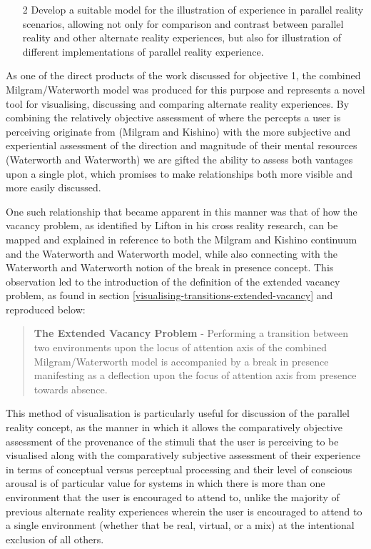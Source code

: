 \begin{enumerate}
	\item[2] Develop a suitable model for the illustration of experience in parallel reality scenarios, allowing not only for comparison and contrast between parallel reality and other alternate reality experiences, but also for illustration of different implementations of parallel reality experience.
\end{enumerate}

As one of the direct products of the work discussed for objective 1, the combined Milgram/Waterworth model was produced for this purpose and represents a novel tool for visualising, discussing and comparing alternate reality experiences. By combining the relatively objective assessment of where the percepts a user is perceiving originate from (Milgram and Kishino) with the more subjective and experiential assessment of the direction and magnitude of their mental resources (Waterworth and Waterworth) we are gifted the ability to assess both vantages upon a single plot, which promises to make relationships both more visible and more easily discussed.

One such relationship that became apparent in this manner was that of how the vacancy problem, as identified by Lifton in his cross reality research, can be mapped and explained in reference to both the Milgram and Kishino continuum and the Waterworth and Waterworth model, while also connecting with the Waterworth and Waterworth notion of the break in presence concept. This observation led to the introduction of the definition of the extended vacancy problem, as found in section \ref{visualising-transitions-extended-vacancy} and reproduced below:

\begin{quote}
	\textbf{The Extended Vacancy Problem} - Performing a transition between two environments upon the locus of attention axis of the combined Milgram/Waterworth model is accompanied by a break in presence manifesting as a deflection upon the focus of attention axis from presence towards absence.
\end{quote}

This method of visualisation is particularly useful for discussion of the parallel reality concept, as the manner in which it allows the comparatively objective assessment of the provenance of the stimuli that the user is perceiving to be visualised along with the comparatively subjective assessment of their experience in terms of conceptual versus perceptual processing and their level of conscious arousal is of particular value for systems in which there is more than one environment that the user is encouraged to attend to, unlike the majority of previous alternate reality experiences wherein the user is encouraged to attend to a single environment (whether that be real, virtual, or a mix) at the intentional exclusion of all others.

